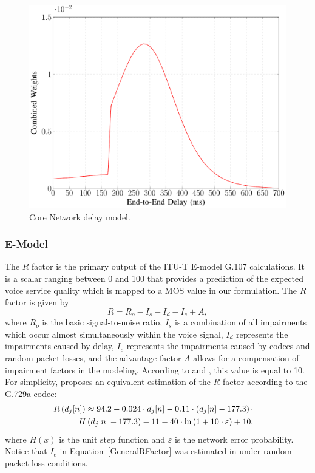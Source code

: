 \documentclass[12pt]{article}
\newcommand{\EqRef}[1]{Equation~\ref{#1}}
\begin{document}
\begin{figure}
	\centering
	\includegraphics[width=0.55\linewidth,page=5]{figs_wp2/figs_BRUNO_PEDRO/plots}
	\caption{Core Network delay model.}
	\label{Fig:EndToEndDelay}
\end{figure}	

\subsubsection{E-Model}
The $ R $ factor is the primary output of the ITU-T E-model G.107 \cite{itu2005107} calculations. It is a scalar ranging between 0 and 100 that provides a prediction of the expected voice service quality which is mapped to a \ac{MOS} value in our formulation. The $ R $ factor is given by
%
\begin{equation}
\label{GeneralRFactor}
R = R_o - I_s - I_d - I_e + A,
\end{equation} 
%
where $R_o$ is the basic signal-to-noise ratio, $I_s$ is a combination of all impairments which occur almost simultaneously within the voice signal, $I_d $ represents the impairments caused by delay, $I_e$ represents the impairments caused by codecs and random packet losses, and the advantage factor $A$ allows for a compensation of impairment factors in the modeling. According to \cite{itu2005107} and \cite{cole2001voice}, this value is equal to 10.
For simplicity, \cite{cole2001voice} proposes an equivalent estimation of the $ R $ factor according to the G.729a codec:
%
\begin{align}
R\left(d_j[n]\right) \approx 94.2 - 0.024 \cdot d_j[n] - 0.11 \cdot \left(d_j[n] - 177.3\right) \cdot  \notag \\ H\left(d_j[n] - 177.3\right) - 11 - 40 \cdot \ln\left(1 + 10\cdot \varepsilon\right) + 10. &	
\end{align}
%
where $H(x)$ is the unit step function and $\varepsilon$ is the network error probability. Notice that $I_e$ in \EqRef{GeneralRFactor} was estimated in \cite{cole2001voice} under random packet loss conditions.
%		
%		
\end{document}
